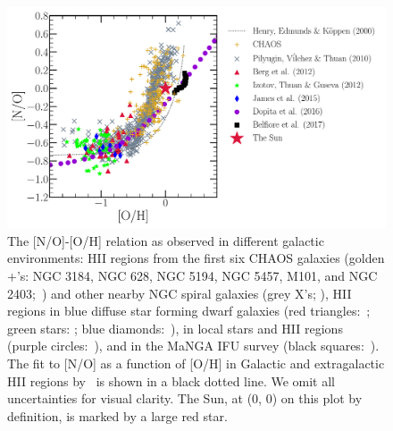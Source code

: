 \documentclass[ms.tex]{subfiles}
\begin{document}
\begin{figure}
\centering
\includegraphics[scale = 0.45]{no_oh_observed.pdf}
\caption{
	The [N/O]-[O/H] relation as observed in different galactic environments:
	HII regions from the first six CHAOS galaxies (golden +'s: NGC 3184, NGC
	628, NGC 5194, NGC 5457, M101, and NGC 2403;~\citealp{Berg2020,
	Skillman2020, Rogers2021}) and other nearby NGC spiral galaxies (grey X's;
	\citealp{Pilyugin2010}), HII regions in blue diffuse star forming dwarf
	galaxies (red triangles:~\citealp{Berg2012}; green stars:
	\citealp{Izotov2012}; blue diamonds:~\citealp{James2015}), in local stars
	and HII regions (purple circles:~\citealp{Dopita2016}), and in the MaNGA
	IFU survey (black squares:~\citealp{Belfiore2017}).
	The fit to [N/O] as a function of [O/H] in Galactic and extragalactic HII
	regions by~\citet{Henry2000} is shown in a black dotted line.
	We omit all uncertainties for visual clarity.
	The Sun, at (0, 0) on this plot by definition, is marked by a large red
	star. 
}
\label{fig:no_oh_observed}
\end{figure}
\end{document}
